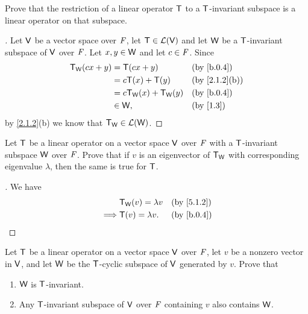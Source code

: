 \setcounter{ex}{6}
\begin{ex}\label{ex:5.4.7}
	Prove that the restriction of a linear operator \(\mathsf{T}\) to a \(\mathsf{T}\)-invariant subspace is a linear operator on that subspace.
\end{ex}

\begin{proof}[]
	Let \(\mathsf{V}\) be a vector space over \(\mathit{F}\), let \(\mathsf{T} \in \mathcal{L}(\mathsf{V})\) and let \(\mathsf{W}\) be a \(\mathsf{T}\)-invariant subspace of \(\mathsf{V}\) over \(\mathit{F}\).
	Let \(x, y \in \mathsf{W}\) and let \(c \in \mathit{F}\).
	Since
	\begin{align*}
		\T_{\W}(cx + y) & = \T(cx + y)                &  & \by{b.0.4}    \\
		                & = c \T(x) + \T(y)           &  & \by{2.1.2}[b] \\
		                & = c \T_{\W}(x) + \T_{\W}(y) &  & \by{b.0.4}    \\
		                & \in \W,                     &  & \by{1.3}
	\end{align*}
	by \cref{2.1.2}(b) we know that \(\mathsf{T}_{\mathsf{W}} \in \mathcal{L}(\mathsf{W})\).
\end{proof}

\begin{ex}\label{ex:5.4.8}
	Let \(\mathsf{T}\) be a linear operator on a vector space \(\mathsf{V}\) over \(\mathit{F}\) with a \(\mathsf{T}\)-invariant subspace \(\mathsf{W}\) over \(\mathit{F}\).
	Prove that if \(v\) is an eigenvector of \(\mathsf{T}_{\mathsf{W}}\) with corresponding eigenvalue \(\lambda\), then the same is true for \(\mathsf{T}\).
\end{ex}

\begin{proof}[]
	We have
	\begin{align*}
		         & \T_{\W}(v) = \lambda v &  & \by{5.1.2} \\
		\implies & \T(v) = \lambda v.     &  & \by{b.0.4}
	\end{align*}
\end{proof}

\setcounter{ex}{10}
\begin{ex}\label{ex:5.4.11}
	Let \(\mathsf{T}\) be a linear operator on a vector space \(\mathsf{V}\) over \(\mathit{F}\), let \(v\) be a nonzero vector in \(\mathsf{V}\), and let \(\mathsf{W}\) be the \(\mathsf{T}\)-cyclic subspace of \(\mathsf{V}\) generated by \(v\).
	Prove that
	\begin{enumerate}
		\item \(\mathsf{W}\) is \(\mathsf{T}\)-invariant.
		\item Any \(\mathsf{T}\)-invariant subspace of \(\mathsf{V}\) over \(\mathit{F}\) containing \(v\) also contains \(\mathsf{W}\).
	\end{enumerate}
\end{ex}

